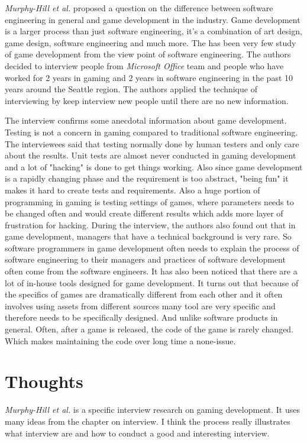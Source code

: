 \documentclass[sigconf]{acmart}
\begin{document}
{\it Murphy-Hill et al.} proposed a question on the difference between software engineering in general and game development in the industry. Game development is a larger process than just software engineering, it's a combination of art design, game design, software engineering and much more. The has been very few study of game development from the view point of software engineering. The authors decided to interview people from {\it Microsoft Office} team and people who have worked for 2 years in gaming and 2 years in software engineering in the past 10 years around the Seattle region. The authors applied the technique of interviewing by keep interview new people until there are no new information.

The interview confirms some anecdotal information about game development. Testing is not a concern in gaming compared to traditional software engineering. The interviewees said that testing normally done by human testers and only care about the results. Unit tests are almost never conducted in gaming development and a lot of "hacking" is done to get things working. Also since game development is a rapidly changing phase and the requirement is too abstract, "being fun" it makes it hard to create tests and requirements. Also a huge portion of programming in gaming is testing settings of games, where parameters needs to be changed often and would create different results which adds more layer of frustration for hacking. During the interview, the authors also found out that in game development, managers that have a technical background is very rare. So software programmers in game development often needs to explain the process of software engineering to their managers and practices of software development often come from the software engineers. It has also been noticed that there are a lot of in-house tools designed for game development. It turns out that because of the specifics of games are dramatically different from each other and it often involves using assets from different sources many tool are very specific and therefore needs to be specifically designed. And unlike software products in general. Often, after a game is released, the code of the game is rarely changed. Which makes maintaining the code over long time a none-issue.

\section{Thoughts}

{\it Murphy-Hill et al.} is a specific interview research on gaming development. It uses many ideas from the chapter on interview. I think the process really illustrates what interview are and how to conduct a good and interesting interview. 
\end{document}
